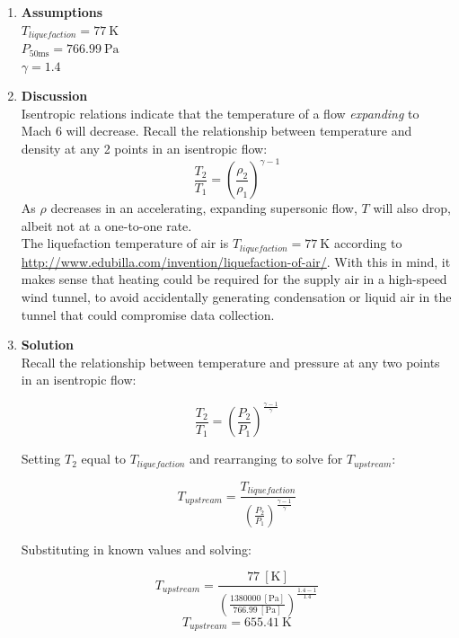 \documentclass[12pt,letterpaper]{article}
\begin{document}
\begin{enumerate}[label=(\alph*)]
\begin{enumerate}[label=\arabic*.]
			\item{\textbf{Assumptions}}\\
			$T_{liquefaction} = 77 \ \unit{\kelvin}$\\
			$P_{50 \unit{\ms}} = 766.99 \ \unit{\pascal}$\\
			$\gamma = 1.4$
			
			\item{\textbf{Discussion}}\\
			Isentropic relations indicate that the temperature of a flow \textit{expanding} to Mach 6 will decrease.
			Recall the relationship between temperature and density at any 2 points in an isentropic flow:
			\begin{equation*}
				\frac{T_2}{T_1} = {\left(\frac{\rho_2}{\rho_1}\right)}^{\gamma-1}
			\end{equation*}
			As $\rho$ decreases in an accelerating, expanding supersonic flow, $T$ will also drop, albeit not at a one-to-one rate. \\
			The liquefaction temperature of air is $T_{liquefaction} = 77 \ \unit{\kelvin}$ according to \url{http://www.edubilla.com/invention/liquefaction-of-air/}.
			With this in mind, it makes sense that heating could be required for the supply air in a high-speed wind tunnel, to avoid accidentally generating condensation or liquid air in the tunnel that could compromise data collection.


			\item{\textbf{Solution}}\\
			Recall the relationship between temperature and pressure at any two points in an isentropic flow:

			\begin{equation*}
				\frac{T_2}{T_1} = \left({\frac{P_2}{P_1}}\right)^{\frac{\gamma-1}{\gamma}}
			\end{equation*}

			Setting $T_2$ equal to $T_{liquefaction}$ and rearranging to solve for $T_{upstream}$:

			\begin{equation*}
				T_{upstream} = \frac{T_{liquefaction}}{\left({\frac{P_2}{P_1}}\right)^{\frac{\gamma-1}{\gamma}}}
			\end{equation*}

			Substituting in known values and solving:

			\begin{equation*}
				T_{upstream} = \frac{77 \ \left[\unit{\kelvin}\right]}{\left(\frac{1380000 \ [\unit{\pascal}]}{766.99 \ [\unit{\pascal}]}\right)^{\frac{1.4-1}{1.4}}}
			\end{equation*}
			\begin{equation*}
				\boxed{T_{upstream} = 655.41\  \unit{\kelvin}}
			\end{equation*}
			

\end{enumerate}
\end{enumerate}
\end{document}
